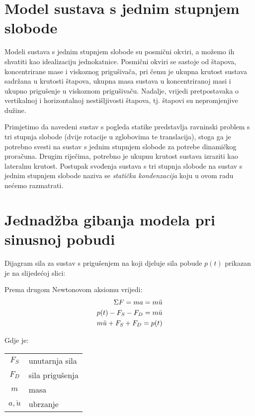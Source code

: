 \section{Model sustava s jednim stupnjem slobode}
Modeli sustava s jednim stupnjem slobode su posmični okviri, a možemo ih shvatiti
kao idealizaciju jednokatnice. Posmični okviri se sastoje od štapova, koncentrirane
mase i viskoznog prigušivača, pri čemu je ukupna krutost sustava sadržana u krutosti
štapova, ukupna masa sustava u koncentriranoj masi i ukupno prigušenje u viskoznom
prigušivaču. Nadalje, vrijedi pretpostavaka o vertikalnoj i horizontalnoj
nestišljivosti štapova, tj. štapovi su nepromjenjive dužine.


Primjetimo da navedeni sustav s pogleda statike predstavlja ravninski problem s tri
stupnja slobode (dvije rotacije u zglobovima te translacija), stoga ga je potrebno
svesti na sustav s jednim stupnjem slobode za potrebe dinamičkog proračuna. Drugim
riječima, potrebno je ukupnu krutost sustava izraziti kao lateralnu krutost.
Postupak svođenja sustava s tri stupnja slobode na sustav s jednim stupnjem slobode
naziva se \textit{statička kondenzacija} koju u ovom radu nećemo razmatrati.

\section{Jednadžba gibanja modela pri sinusnoj pobudi}
Dijagram sila za sustav s prigušenjem na koji djeluje sila pobude $p(t)$ prikazan je
na slijedećoj slici:


Prema drugom Newtonovom aksiomu vrijedi:
\begin{align}
    \Sigma F = ma = m\ddot{u}\notag\\
        p(t) - F_S - F_D = m\ddot{u} \notag\\
        m\ddot{u} + F_S + F_D = p(t) \label{eq:newton}
\end{align}

Gdje je:\\
\begin{table}[H]
\begin{tabular}{c l}
	$F_S$ & unutarnja sila \\
	$F_D$ & sila prigušenja \\
	$m$   & masa \\
        $a,\ddot{u}$   & ubrzanje\\
\end{tabular}
\end{table}

